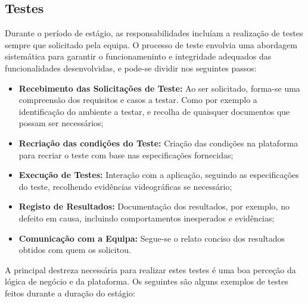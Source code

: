     \subsection{Testes}\label{sub:tests}

        Durante o período de estágio, as responsabilidades incluíam a realização de testes sempre que solicitado pela equipa. O processo de teste envolvia uma abordagem sistemática para garantir o funcionameninto e integridade adequados das funcionalidades desenvolvidas, e pode-se dividir nos seguintes passos:

        \begin{itemize}
            \item \textbf{Recebimento das Solicitações de Teste:} Ao ser solicitado, forma-se uma compreensão dos requisitos e casos a testar. Como por exemplo a identificação do ambiente a testar, e recolha de quaisquer documentos que possam ser necessários;
            \item \textbf{Recriação das condições do Teste:} Criação das condições na plataforma para recriar o teste com base nas especificações fornecidas;
            \item \textbf{Execução de Testes:} Interação com a aplicação, seguindo as especificações do teste, recolhendo evidências videográficas se necessário;
            \item \textbf{Registo de Resultados:} Documentação dos resultados, por exemplo, no defeito em causa, incluindo comportamentos inesperados e evidências;
            \item \textbf{Comunicação com a Equipa:} Segue-se o relato conciso dos resultados obtidos com quem os solicitou.
        \end{itemize}

        A principal destreza necessária para realizar estes testes é uma boa perceção da lógica de negócio e da plataforma. Os seguintes são alguns exemplos de testes feitos durante a duração do estágio:

